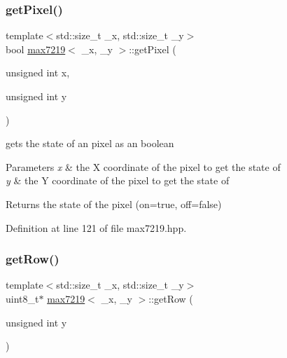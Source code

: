 \subsubsection{\texorpdfstring{get\+Pixel()}{getPixel()}}
{\footnotesize\ttfamily template$<$std\+::size\+\_\+t \+\_\+x, std\+::size\+\_\+t \+\_\+y$>$ \\
bool \mbox{\hyperlink{classmax7219}{max7219}}$<$ \+\_\+x, \+\_\+y $>$\+::get\+Pixel (\begin{DoxyParamCaption}\item[{unsigned int}]{x,  }\item[{unsigned int}]{y }\end{DoxyParamCaption})\hspace{0.3cm}{\ttfamily [inline]}}



gets the state of an pixel as an boolean 


\begin{DoxyParams}{Parameters}
{\em x} & the X coordinate of the pixel to get the state of \\
\hline
{\em y} & the Y coordinate of the pixel to get the state of \\
\hline
\end{DoxyParams}
\begin{DoxyReturn}{Returns}
the state of the pixel (on=true, off=false) 
\end{DoxyReturn}


Definition at line 121 of file max7219.\+hpp.

\mbox{\label{classmax7219_ada812c3eed0a655300d2f3914910f103}} 
\subsubsection{\texorpdfstring{get\+Row()}{getRow()}}
{\footnotesize\ttfamily template$<$std\+::size\+\_\+t \+\_\+x, std\+::size\+\_\+t \+\_\+y$>$ \\
uint8\+\_\+t$\ast$ \mbox{\hyperlink{classmax7219}{max7219}}$<$ \+\_\+x, \+\_\+y $>$\+::get\+Row (\begin{DoxyParamCaption}\item[{unsigned int}]{y }\end{DoxyParamCaption})\hspace{0.3cm}{\ttfamily [inline]}}



